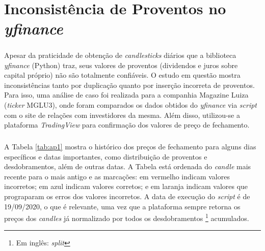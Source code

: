 \chapter{Inconsistência de Proventos no \textit{yfinance}}
\label{ApendiceA}

\paragraph{} Apesar da praticidade de obtenção de \textit{candlesticks} diários que a biblioteca \textit{yfinance} (Python) traz, seus valores de proventos (dividendos e juros sobre capital próprio) não são totalmente confiáveis. O estudo em questão mostra inconsistências tanto por duplicação quanto por inserção incorreta de proventos. Para isso, uma análise de caso foi realizada para a companhia Magazine Luiza (\textit{ticker} MGLU3), onde foram comparados os dados obtidos do \textit{yfinance} via \textit{script} com o site de relações com investidores \cite{mglu_ri} da mesma. Além disso, utilizou-se a plataforma \textit{TradingView} \cite{tradingview} para confirmação dos valores de preço de fechamento.


\paragraph{} A Tabela \ref{tab:ap1} mostra o histórico dos preços de fechamento para alguns dias específicos e datas importantes, como distribuição de proventos e desdobramentos, além de outras datas. A Tabela está ordenada do \textit{candle} mais recente para o mais antigo e as marcações: em vermelho indicam valores incorretos; em azul indicam valores corretos; e em laranja indicam valores que prograparam os erros dos valores incorretos. A data de execução do \textit{script} é de 19/09/2020, o que é relevante, uma vez que a plataforma sempre retorna os preços dos \textit{candles} já normalizado por todos os desdobramentos \footnote{Em inglês: \textit{split}} acumulados.


